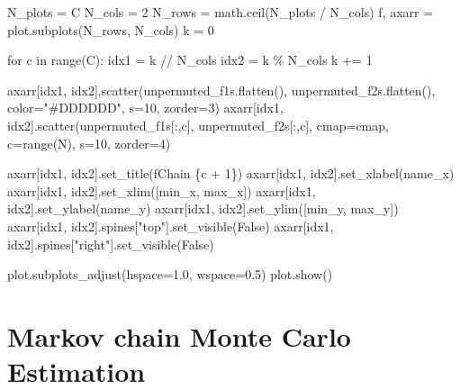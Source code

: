 \documentclass[
  letterpaper,
  DIV=11,
  numbers=noendperiod]{scrartcl}
\newenvironment{Shaded}{\begin{snugshade}}{\end{snugshade}}
\newcommand{\BuiltInTok}[1]{\textcolor[rgb]{0.00,0.23,0.31}{#1}}
\newcommand{\ControlFlowTok}[1]{\textcolor[rgb]{0.00,0.23,0.31}{#1}}
\newcommand{\DecValTok}[1]{\textcolor[rgb]{0.68,0.00,0.00}{#1}}
\newcommand{\FloatTok}[1]{\textcolor[rgb]{0.68,0.00,0.00}{#1}}
\newcommand{\KeywordTok}[1]{\textcolor[rgb]{0.00,0.23,0.31}{#1}}
\newcommand{\NormalTok}[1]{\textcolor[rgb]{0.00,0.23,0.31}{#1}}
\newcommand{\OperatorTok}[1]{\textcolor[rgb]{0.37,0.37,0.37}{#1}}
\newcommand{\SpecialCharTok}[1]{\textcolor[rgb]{0.37,0.37,0.37}{#1}}
\newcommand{\SpecialStringTok}[1]{\textcolor[rgb]{0.13,0.47,0.30}{#1}}
\newcommand{\StringTok}[1]{\textcolor[rgb]{0.13,0.47,0.30}{#1}}
\newcommand{\VariableTok}[1]{\textcolor[rgb]{0.07,0.07,0.07}{#1}}
\begin{document}
\begin{Shaded}
\begin{Highlighting}[]
\NormalTok{  N\_plots }\OperatorTok{=}\NormalTok{ C}
\NormalTok{  N\_cols }\OperatorTok{=} \DecValTok{2}
\NormalTok{  N\_rows }\OperatorTok{=}\NormalTok{ math.ceil(N\_plots }\OperatorTok{/}\NormalTok{ N\_cols)}
\NormalTok{  f, axarr }\OperatorTok{=}\NormalTok{ plot.subplots(N\_rows, N\_cols)}
\NormalTok{  k }\OperatorTok{=} \DecValTok{0}
  
  \ControlFlowTok{for}\NormalTok{ c }\KeywordTok{in} \BuiltInTok{range}\NormalTok{(C):}
\NormalTok{    idx1 }\OperatorTok{=}\NormalTok{ k }\OperatorTok{//}\NormalTok{ N\_cols}
\NormalTok{    idx2 }\OperatorTok{=}\NormalTok{ k }\OperatorTok{\%}\NormalTok{ N\_cols}
\NormalTok{    k }\OperatorTok{+=} \DecValTok{1}
    
\NormalTok{    axarr[idx1, idx2].scatter(unpermuted\_f1s.flatten(), }
\NormalTok{                              unpermuted\_f2s.flatten(),}
\NormalTok{                              color}\OperatorTok{=}\StringTok{"\#DDDDDD"}\NormalTok{, s}\OperatorTok{=}\DecValTok{10}\NormalTok{, zorder}\OperatorTok{=}\DecValTok{3}\NormalTok{)}
\NormalTok{    axarr[idx1, idx2].scatter(unpermuted\_f1s[:,c], unpermuted\_f2s[:,c],}
\NormalTok{                              cmap}\OperatorTok{=}\NormalTok{cmap, c}\OperatorTok{=}\BuiltInTok{range}\NormalTok{(N), s}\OperatorTok{=}\DecValTok{10}\NormalTok{, zorder}\OperatorTok{=}\DecValTok{4}\NormalTok{)}
    
\NormalTok{    axarr[idx1, idx2].set\_title(}\SpecialStringTok{f\textquotesingle{}Chain }\SpecialCharTok{\{}\NormalTok{c }\OperatorTok{+} \DecValTok{1}\SpecialCharTok{\}}\SpecialStringTok{\textquotesingle{}}\NormalTok{)}
\NormalTok{    axarr[idx1, idx2].set\_xlabel(name\_x)}
\NormalTok{    axarr[idx1, idx2].set\_xlim([min\_x, max\_x])}
\NormalTok{    axarr[idx1, idx2].set\_ylabel(name\_y)}
\NormalTok{    axarr[idx1, idx2].set\_ylim([min\_y, max\_y])}
\NormalTok{    axarr[idx1, idx2].spines[}\StringTok{"top"}\NormalTok{].set\_visible(}\VariableTok{False}\NormalTok{)}
\NormalTok{    axarr[idx1, idx2].spines[}\StringTok{"right"}\NormalTok{].set\_visible(}\VariableTok{False}\NormalTok{)}
  
\NormalTok{  plot.subplots\_adjust(hspace}\OperatorTok{=}\FloatTok{1.0}\NormalTok{, wspace}\OperatorTok{=}\FloatTok{0.5}\NormalTok{)}
\NormalTok{  plot.show()}
\end{Highlighting}
\end{Shaded}

\hypertarget{markov-chain-monte-carlo-estimation}{%
\section{Markov chain Monte Carlo
Estimation}\label{markov-chain-monte-carlo-estimation}}
\end{document}
